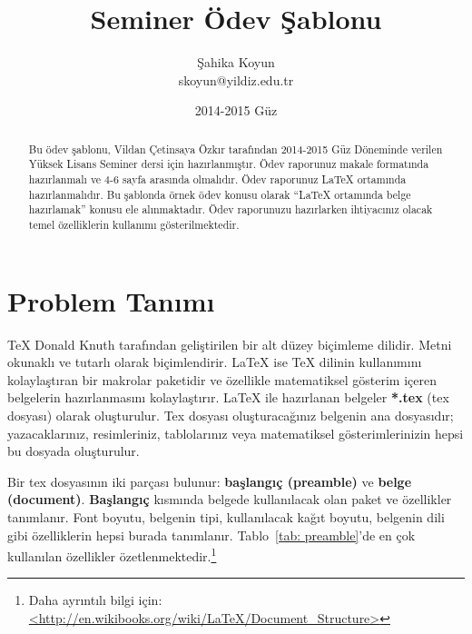 \documentclass{article}
\begin{document}
\title{Seminer Ödev Şablonu}
\date{2014-2015 Güz}
\author{Şahika Koyun \\ \small{skoyun@yildiz.edu.tr}}
\maketitle

\begin{abstract}
Bu ödev şablonu, Vildan Çetinsaya Özkır tarafından 2014-2015 Güz Döneminde verilen Yüksek Lisans Seminer dersi için hazırlanmıştır. Ödev raporunuz makale formatında hazırlanmalı ve 4-6 sayfa arasında olmalıdır. Ödev raporunuz {\LaTeX} ortamında hazırlanmalıdır. Bu şablonda örnek ödev konusu olarak ``{\LaTeX} ortamında belge hazırlamak'' konusu ele alınmaktadır. Ödev raporunuzu hazırlarken ihtiyacınız olacak temel özelliklerin kullanımı gösterilmektedir.
\end{abstract}

\section{Problem Tanımı}

{\TeX} Donald Knuth tarafından geliştirilen bir alt düzey biçimleme dilidir. Metni okunaklı ve tutarlı olarak biçimlendirir. {\LaTeX} ise {\TeX} dilinin kullanımını kolaylaştıran bir makrolar paketidir ve özellikle matematiksel gösterim içeren belgelerin hazırlanmasını kolaylaştırır. {\LaTeX} ile hazırlanan belgeler \textbf{*.tex} (tex dosyası) olarak oluşturulur. Tex dosyası oluşturacağınız belgenin ana dosyasıdır; yazacaklarınız, resimleriniz, tablolarınız veya matematiksel gösterimlerinizin hepsi bu dosyada oluşturulur.

Bir tex dosyasının iki parçası bulunur: \textbf{başlangıç (preamble)} ve \textbf{belge (document)}. \textbf{Başlangıç} kısmında belgede kullanılacak olan paket ve özellikler tanımlanır. Font boyutu, belgenin tipi, kullanılacak kağıt boyutu, belgenin dili gibi özelliklerin hepsi burada tanımlanır. Tablo~\ref{tab: preamble}'de en çok kullanılan özellikler özetlenmektedir.\footnote{Daha ayrıntılı bilgi için: \url{<http://en.wikibooks.org/wiki/LaTeX/Document_Structure>}}
\end{document}
